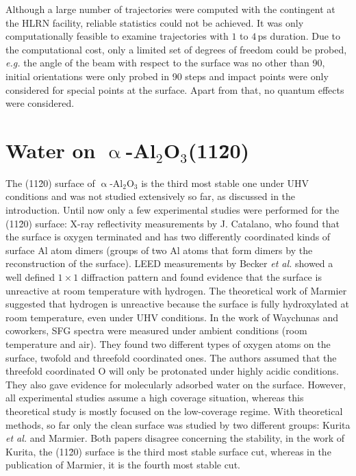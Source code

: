 \documentclass[11pt,DIV=13,BCOR=5mm,a4paper,headinclude]{scrbook}
\begin{document}
Although a large number of trajectories were computed with the contingent at the HLRN facility, reliable statistics could not be achieved.
It was only computationally feasible to examine trajectories with $1$ to $4\,$ps duration.
Due to the computational cost, only a limited set of degrees of freedom could be probed, \textit{e.g.} the angle of the beam with respect to the surface was no other than 90\textdegree{}, initial orientations were only probed in 90\textdegree{} steps and impact points were only considered for special points at the surface.
Apart from that, no quantum effects were considered.
\clearpage

\chapter[Water on $\upalpha$-Al$_2$O$_3$(11\=20)]{Water on $\upalpha$-Al$_2$O$_3$(11\=20)\cite{Heiden11-20_2018}}

The (11\=20) surface of $\upalpha$-Al$_2$O$_3$ is the third most stable one under UHV conditions and was not studied extensively so far, as discussed in the introduction.
Until now only a few experimental studies were performed for the (11\=20) surface: X-ray reflectivity measurements by J. Catalano\cite{catalano}, who found that the surface is oxygen terminated and has two differently coordinated kinds of surface Al atom dimers (groups of two Al atoms that form dimers by the reconstruction of the surface).
LEED measurements by Becker \textit{et al.}\cite{Becker2002} showed a well defined $1\times 1$ diffraction pattern and found evidence that the surface is unreactive at room temperature with hydrogen.
The theoretical work of Marmier\cite{marmier} suggested that hydrogen is unreactive because the surface is fully hydroxylated at room temperature, even under UHV conditions.
In the work of Waychunas and coworkers\cite{sung}, SFG spectra were measured under ambient conditions (room temperature and air).
They found two different types of oxygen atoms on the surface, twofold and threefold coordinated ones.
The authors assumed that the threefold coordinated O will only be protonated under highly acidic conditions.
They also gave evidence for molecularly adsorbed water on the surface.
However, all experimental studies\cite{catalano,sung,Becker2002} assume a high coverage situation, whereas this theoretical study is mostly focused on the low-coverage regime.
With theoretical methods, so far only the clean surface was studied by two different groups: Kurita \textit{et al.}\cite{kuri10} and Marmier\cite{marmier}.
Both papers disagree concerning the stability, in the work of Kurita, the (11\=20) surface is the third most stable surface cut, whereas in the publication of Marmier, it is the fourth most stable cut.
\end{document}
